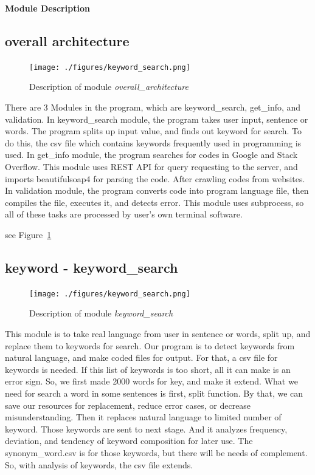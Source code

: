 \documentclass[conference]{IEEEtran}
\begin{document}
\textbf{Module Description}

\subsection{overall architecture} %
\label{sub:overall_architecture}
\begin{figure}[ht]
\centering
\texttt{[image: ./figures/keyword\_search.png]}
\caption{Description of module \textit{overall\_architecture}}
\label{overall_architecture}
\end{figure}


There are 3 Modules in the program, which are keyword_search, get_info, and validation. In keyword_search module, the program takes user input, sentence or words. The program splits up input value, and finds out keyword for search. To do this, the csv file which contains keywords frequently used in programming is used. In get_info module, the program searches for codes in Google and Stack Overflow. This module uses REST API for query requesting to the server, and imports beautifulsoap4 for parsing the code. After crawling codes from websites. In validation module, the program converts code into program language file, then compiles the file, executes it, and detects error. This module uses subprocess, so all of these tasks are processed by user’s own terminal software.

see Figure~\ref{overall_architecture}


\subsection{keyword - keyword\_search} %
\label{sub:keyword_search}
\begin{figure}[ht]
\centering
\texttt{[image: ./figures/keyword\_search.png]}
\caption{Description of module \textit{keyword\_search}}
\label{keyword_search}
\end{figure}


This module is to take real language from user in sentence or words, split up, and replace them to keywords for search. Our program is to detect keywords from natural language, and make coded files for output. For that, a csv file for keywords is needed. If this list of keywords is too short, all it can make is an error sign. So, we first made 2000 words for key, and make it extend. What we need for search a word in some sentences is first, split function. By that, we can save our resources for replacement, reduce error cases, or decrease misunderstanding. Then it replaces natural language to limited number of keyword. Those keywords are sent to next stage. And it analyzes frequency, deviation, and tendency of keyword composition for later use. The synonym\_word.csv is for those keywords, but there will be needs of complement. So, with analysis of keywords, the csv file extends. 
\end{document}
